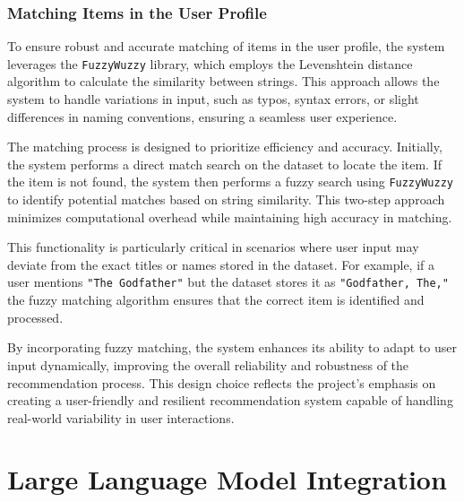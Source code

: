 \subsubsection{Matching Items in the User Profile}
\label{subsubsec:matching_items_in_user_profile}
To ensure robust and accurate matching of items in the user profile, the system leverages the \texttt{FuzzyWuzzy} library\cite{FuzzyWuzzy}, which employs the Levenshtein distance algorithm to calculate the similarity between strings. This approach allows the system to handle variations in input, such as typos, syntax errors, or slight differences in naming conventions, ensuring a seamless user experience.

The matching process is designed to prioritize efficiency and accuracy. Initially, the system performs a direct match search on the dataset to locate the item. If the item is not found, the system then performs a fuzzy search using \texttt{FuzzyWuzzy} to identify potential matches based on string similarity. This two-step approach minimizes computational overhead while maintaining high accuracy in matching.

This functionality is particularly critical in scenarios where user input may deviate from the exact titles or names stored in the dataset. For example, if a user mentions \texttt{"The Godfather"} but the dataset stores it as \texttt{"Godfather, The,"} the fuzzy matching algorithm ensures that the correct item is identified and processed.

By incorporating fuzzy matching, the system enhances its ability to adapt to user input dynamically, improving the overall reliability and robustness of the recommendation process. This design choice reflects the project's emphasis on creating a user-friendly and resilient recommendation system capable of handling real-world variability in user interactions.

\section{Large Language Model Integration}
\label{sec:large_language_model_integration}

